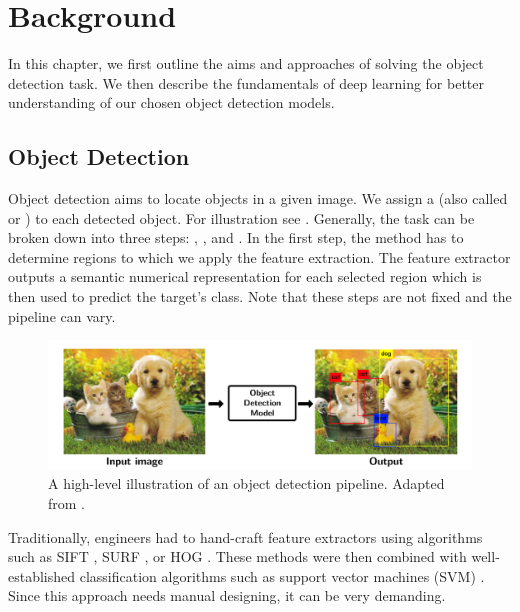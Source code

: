 \chapter{Background}
In this chapter, we first outline the aims and approaches of solving the object
detection task. We then describe the fundamentals of deep learning for better
understanding of our chosen object detection models.

\section{Object Detection}
Object detection aims to locate objects in a given image. We assign a
 (also called  or ) to each detected object.
For illustration see . Generally, the task can be broken
down into three steps: ,
, and . In the first step, the
method has to determine regions to which we apply the feature extraction. The
feature extractor outputs a semantic numerical representation for each selected
region which is then used to predict the target's class. Note that these steps are
not fixed and the pipeline can vary.

\begin{figure}[h]
    \centering
    \includegraphics[width=0.9\linewidth]{Sources/Figures/objectdetection.png}
    \caption{A high-level illustration of an object detection pipeline. Adapted
        from \cite{objectdetectionfigure}.}
    \label{fig:od}
\end{figure}

Traditionally, engineers had to hand-craft feature extractors using algorithms
such as SIFT \cite{sift}, SURF \cite{surf}, or HOG \cite{hog}. These methods were
then combined with well-established classification algorithms such as support
vector machines (SVM) \cite{svm}. Since this approach needs manual designing, it
can be very demanding.


